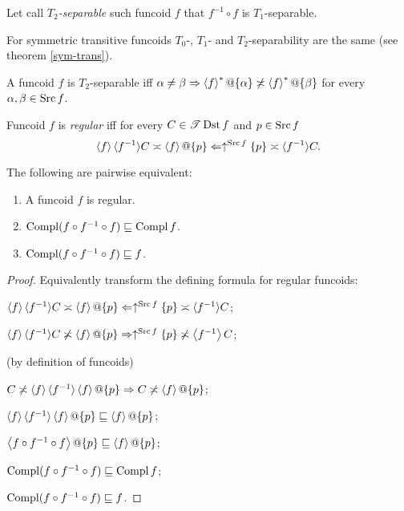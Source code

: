 \begin{defn}
Let call \emph{$T_{2}$-separable} such funcoid $f$ that $f^{-1}\circ f$
is $T_{1}$-separable.
\end{defn}
For symmetric transitive funcoids $T_{0}$-, $T_{1}$- and $T_{2}$-separability
are the same (see theorem \ref{sym-trans}).
\begin{obvious}
A funcoid $f$ is $T_{2}$-separable iff $\alpha\ne\beta\Rightarrow\left\langle f\right\rangle ^{\ast}@\{\alpha\}\not\asymp\left\langle f\right\rangle ^{\ast}@\{\beta\}$
for every $\alpha,\beta\in\operatorname{Src} f$.\end{obvious}
\begin{defn}
Funcoid $f$ is \emph{regular} iff for every $C\in\mathscr{T}\operatorname{Dst} f$ and
$p\in\operatorname{Src} f$
\[\left\langle f\right\rangle \langle f^{- 1} \rangle C \asymp \left\langle f\right\rangle
@\{ p \} \Leftarrow \uparrow^{\operatorname{Src} f} \{ p \}
\asymp \langle f^{- 1} \rangle C.\]
\end{defn}

\begin{prop}
The following are pairwise equivalent:
\begin{enumerate}
  \item A funcoid $f$ is regular.
  \item $\operatorname{Compl} (f \circ f^{- 1} \circ f) \sqsubseteq \operatorname{Compl} f$.
  \item $\operatorname{Compl} (f \circ f^{- 1} \circ f) \sqsubseteq f$.
\end{enumerate}
\end{prop}

\begin{proof}
Equivalently transform the defining formula for regular funcoids:

$\left\langle f\right\rangle \langle f^{- 1} \rangle C \asymp \left\langle f\right\rangle
@\{ p \} \Leftarrow \uparrow^{\operatorname{Src} f} \{ p \}
\asymp \langle f^{- 1} \rangle C$;

$\left\langle f\right\rangle \langle f^{- 1} \rangle C \not\asymp \left\langle f\right\rangle
@\{ p \} \Rightarrow \uparrow^{\operatorname{Src} f} \{ p \} \not\asymp \left\langle f^{-1}\right\rangle C$;

(by definition of funcoids)

$C \not\asymp \left\langle f\right\rangle \langle f^{- 1} \rangle \left\langle f\right\rangle
@\{ p \} \Rightarrow C \not\asymp \left\langle f\right\rangle
@\{ p \}$;

$\supfun{f} \langle f^{- 1} \rangle \supfun{f}
@\{ p \} \sqsubseteq \supfun{f}@\{ p \}$;

$\left\langle f \circ f^{- 1} \circ f\right\rangle @\{ p \}
\sqsubseteq \left\langle f\right\rangle @\{ p \}$;

$\operatorname{Compl} (f \circ f^{- 1} \circ f) \sqsubseteq \operatorname{Compl} f$;

$\operatorname{Compl} (f \circ f^{- 1} \circ f) \sqsubseteq f$.
\end{proof}

